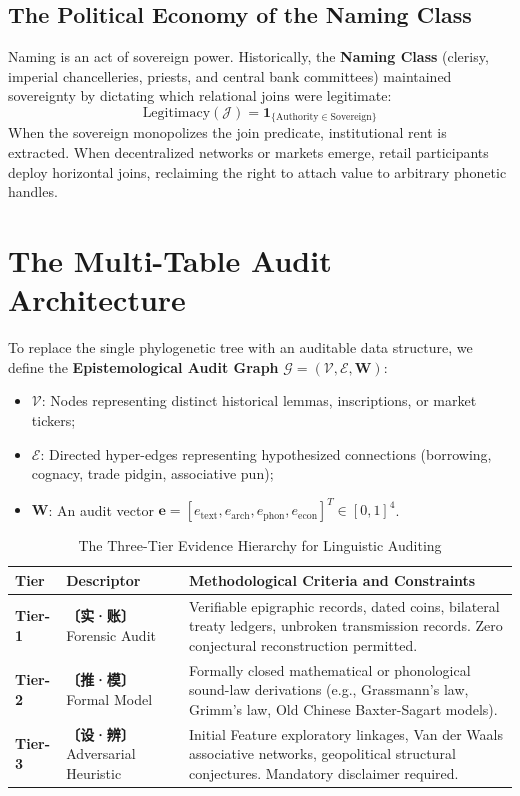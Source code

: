 \documentclass[11pt,a4paper]{article}
\begin{document}
\subsection{The Political Economy of the Naming Class}
Naming is an act of sovereign power. Historically, the \textbf{Naming Class} (clerisy, imperial chancelleries, priests, and central bank committees) maintained sovereignty by dictating which relational joins were legitimate:
\begin{equation}
    \text{Legitimacy}(\mathcal{J}) = \mathbf{1}_{\{\text{Authority} \in \text{Sovereign}\}}
\end{equation}
When the sovereign monopolizes the join predicate, institutional rent is extracted. When decentralized networks or markets emerge, retail participants deploy horizontal joins, reclaiming the right to attach value to arbitrary phonetic handles.

\section{The Multi-Table Audit Architecture}

To replace the single phylogenetic tree with an auditable data structure, we define the \textbf{Epistemological Audit Graph} $\mathcal{G} = (\mathcal{V}, \mathcal{E}, \mathbf{W})$:
\begin{itemize}
    \item $\mathcal{V}$: Nodes representing distinct historical lemmas, inscriptions, or market tickers;
    \item $\mathcal{E}$: Directed hyper-edges representing hypothesized connections (borrowing, cognacy, trade pidgin, associative pun);
    \item $\mathbf{W}$: An audit vector $\mathbf{e} = [e_{\text{text}}, e_{\text{arch}}, e_{\text{phon}}, e_{\text{econ}}]^T \in [0, 1]^4$.
\end{itemize}

\begin{table}[h]
\centering
\small
\caption{The Three-Tier Evidence Hierarchy for Linguistic Auditing}
\label{tab:evidence_tiers}
\begin{tabular}{@{}llp{8.5cm}@{}}
\toprule
\textbf{Tier} & \textbf{Descriptor} & \textbf{Methodological Criteria and Constraints} \\ \midrule
\textbf{Tier-1} & \textbf{〔实·账〕} Forensic Audit & Verifiable epigraphic records, dated coins, bilateral treaty ledgers, unbroken transmission records. Zero conjectural reconstruction permitted. \\
\textbf{Tier-2} & \textbf{〔推·模〕} Formal Model & Formally closed mathematical or phonological sound-law derivations (e.g., Grassmann's law, Grimm's law, Old Chinese Baxter-Sagart models). \\
\textbf{Tier-3} & \textbf{〔设·辨〕} Adversarial Heuristic & Initial Feature exploratory linkages, Van der Waals associative networks, geopolitical structural conjectures. Mandatory disclaimer required. \\ \bottomrule
\end{tabular}
\end{table}
\end{document}

